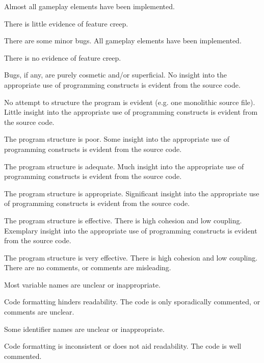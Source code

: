 \documentclass{../fal_assignment}
\begin{document}
\begin{markingrubric}
        \grade Almost all gameplay elements have been implemented.
            \par There is little evidence of feature creep.
            \par There are some minor bugs.
        \grade All gameplay elements have been implemented.
            \par There is no evidence of feature creep.
            \par Bugs, if any, are purely cosmetic and/or superficial.
%
        \grade\fail No insight into the appropriate use of programming constructs is evident from the source code.
            \par No attempt to structure the program is evident (e.g. one monolithic source file).
        \grade Little insight into the appropriate use of programming constructs is evident from the source code.
            \par The program structure is poor.
        \grade Some insight into the appropriate use of programming constructs is evident from the source code.
            \par The program structure is adequate.
        \grade Much insight into the appropriate use of programming constructs is evident from the source code.
            \par The program structure is appropriate.
        \grade Significant insight into the appropriate use of programming constructs is evident from the source code.
            \par The program structure is effective. There is high cohesion and low coupling.
        \grade Exemplary insight into the appropriate use of programming constructs is evident from the source code.
            \par The program structure is very effective. There is high cohesion and low coupling.
%
        \grade\fail There are no comments, or comments are misleading.
            \par Most variable names are unclear or inappropriate.
            \par Code formatting hinders readability.
        \grade The code is only sporadically commented, or comments are unclear.
            \par Some identifier names are unclear or inappropriate.
            \par Code formatting is inconsistent or does not aid readability.
        \grade The code is well commented.

\end{markingrubric}
\end{document}
